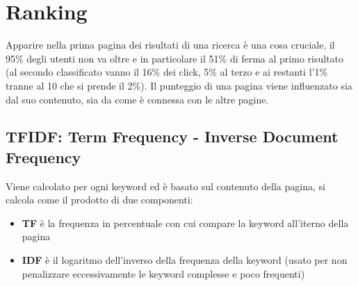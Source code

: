 \section{Ranking}

Apparire nella prima pagina dei risultati di una ricerca è una cosa cruciale, il 95\% degli utenti non va oltre e in particolare il 51\% di ferma al primo risultato (al secondo classificato vanno il 16\% dei click, 5\% al terzo e ai restanti l'1\% tranne al 10 che si prende il 2\%).
Il punteggio di una pagina viene influenzato sia dal suo contenuto, sia da come è connessa con le altre pagine.

\subsection{TFIDF: Term Frequency - Inverse Document Frequency}

Viene calcolato per ogni keyword ed è basato sul contenuto della pagina, si calcola come il prodotto di due componenti:
\begin{itemize}
\item \textbf{TF} è la frequenza in percentuale con cui compare la keyword all'iterno della pagina
\item \textbf{IDF} è il logaritmo dell'inverso della frequenza della keyword (usato per non penalizzare eccessivamente le keyword complesse e poco frequenti)
\end{itemize}

